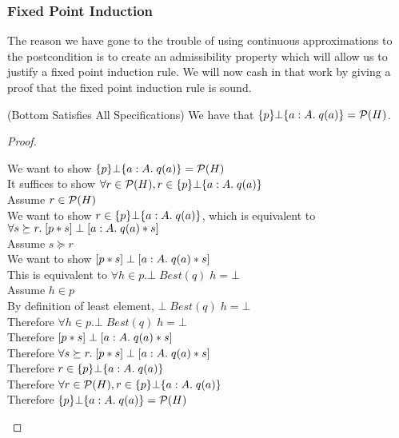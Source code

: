 \subsubsection{Fixed Point Induction}

The reason we have gone to the trouble of using continuous
approximations to the postcondition is to create an admissibility
property which will allow us to justify a fixed point induction rule.
We will now cash in that work by giving a proof that the fixed point
induction rule is sound. 

\begin{lemma}{(Bottom Satisfies All Specifications)}
We have that $\{{p}\}{\bot}\{{a:A}.\;{q(a)}\} = \mathcal{P}(H)$. 
\end{lemma}
\begin{proof}
\begin{tabbedproof}
\oo We want to show $\{{p}\}{\bot}\{{a:A}.\;{q(a)}\} = \mathcal{P}(H)$ \\
\oo It suffices to show $\forall r \in \mathcal{P}(H), r \in \{{p}\}{\bot}\{{a:A}.\;{q(a)}\}$ \\
\oo Assume $r \in \mathcal{P}(H)$ \\
\ooo We want to show $r \in \{{p}\}{\bot}\{{a:A}.\;{q(a)}\}$, which is equivalent to 
     $\forall s \succeq r.\; [{p*s}]\;{\bot}\;[{a:A}.\;{q(a) * s}]$ \\
\ooo Assume $s \succeq r$ \\
\oooo We want to show $[{p*s}]\;{\bot}\;[{a:A}.\;{q(a) * s}]$ \\
\oooo This is equivalent to $\forall h \in p. \bot\;Best(q)\;h = \bot$ \\
\oooo Assume $h \in p$ \\
\ooooo  By definition of least element, $\bot\;Best(q)\;h = \bot$ \\
\oooo Therefore $\forall h \in p. \bot\;Best(q)\;h = \bot$ \\
\oooo Therefore $[{p*s}]\;{\bot}\;[{a:A}.\;{q(a) * s}]$ \\
\ooo Therefore $\forall s \succeq r.\; [{p*s}]\;{\bot}\;[{a:A}.\;{q(a) * s}]$ \\
\ooo Therefore $r \in \{{p}\}{\bot}\{{a:A}.\;{q(a)}\}$ \\
\oo Therefore $\forall r \in \mathcal{P}(H), r \in \{{p}\}{\bot}\{{a:A}.\;{q(a)}\}$ \\
\oo Therefore $\{{p}\}{\bot}\{{a:A}.\;{q(a)}\} = \mathcal{P}(H)$ \\
\end{tabbedproof}
\end{proof}

